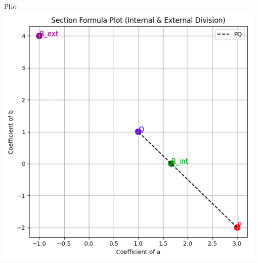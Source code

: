 \documentclass{beamer}
\begin{document}
\begin{frame}{Plot}
    \centering
    \includegraphics[width=\columnwidth, height=0.8\textheight, keepaspectratio]{figs/mg1plot.png}     
\end{frame}
\end{document}
